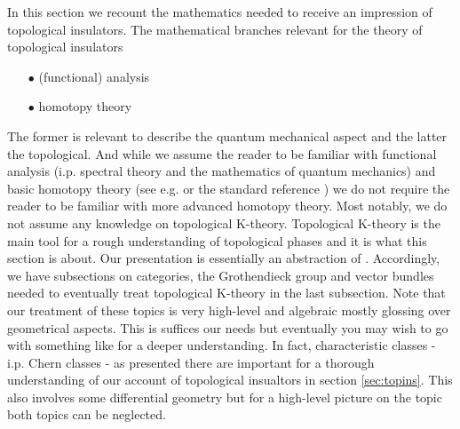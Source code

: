 \nocite{8b5861fc}
\nocite{c7f15065}
In this section we recount the mathematics needed to receive an impression of topological insulators. The mathematical branches relevant for the theory of topological insulators
\begin{enumerate}
\item[$\bullet$]
  (functional) analysis
\item[$\bullet$]
  homotopy theory
\end{enumerate}
The former is relevant to describe the quantum mechanical aspect and the latter the topological. And while we assume the reader to be familiar with functional analysis (i.p. spectral theory and the mathematics of quantum mechanics) and basic homotopy theory (see e.g. \cite{catctxphysics} or the standard reference \cite{8b5861fc}) we do not require the reader to be familiar with more advanced homotopy theory. Most notably, we do not assume any knowledge on topological K-theory. Topological K-theory is the main tool for a rough understanding of topological phases and it is what this section is about. Our presentation is essentially an abstraction of \cite{c7f15065}. Accordingly, we have subsections on categories, the Grothendieck group and vector bundles needed to eventually treat topological K-theory in the last subsection. Note that our treatment of these topics is very high-level and algebraic mostly glossing over geometrical aspects. This is suffices our needs but eventually you may wish to go with something like \cite{c7f15065} for a deeper understanding. In fact, characteristic classes - i.p. Chern classes - as presented there are important for a thorough understanding of our account of topological insualtors in section \ref{sec:topins}. This also involves some differential geometry but for a high-level picture on the topic both topics can be neglected.
\\
